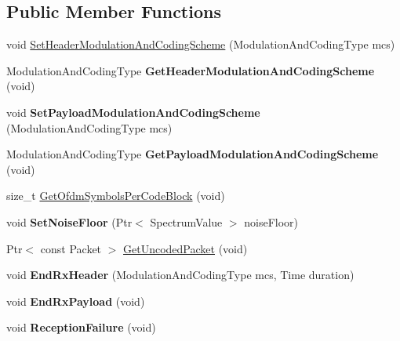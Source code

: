 \subsection*{\-Public \-Member \-Functions}
\begin{DoxyCompactItemize}
\item 
void \hyperlink{classns3_1_1PLC__InformationRatePhy_ac8d28e7f4c56c9c226a1992342ca4c06}{\-Set\-Header\-Modulation\-And\-Coding\-Scheme} (\-Modulation\-And\-Coding\-Type mcs)
\item 
\hypertarget{classns3_1_1PLC__InformationRatePhy_a5ce5620b8bffc866af027aa8cc62dd31}{\-Modulation\-And\-Coding\-Type {\bfseries \-Get\-Header\-Modulation\-And\-Coding\-Scheme} (void)}\label{classns3_1_1PLC__InformationRatePhy_a5ce5620b8bffc866af027aa8cc62dd31}

\item 
\hypertarget{classns3_1_1PLC__InformationRatePhy_a1d5d3ee73e863d3430d8c55eabd73276}{void {\bfseries \-Set\-Payload\-Modulation\-And\-Coding\-Scheme} (\-Modulation\-And\-Coding\-Type mcs)}\label{classns3_1_1PLC__InformationRatePhy_a1d5d3ee73e863d3430d8c55eabd73276}

\item 
\hypertarget{classns3_1_1PLC__InformationRatePhy_aa8b2963fd66fcb0cff550ac447337013}{\-Modulation\-And\-Coding\-Type {\bfseries \-Get\-Payload\-Modulation\-And\-Coding\-Scheme} (void)}\label{classns3_1_1PLC__InformationRatePhy_aa8b2963fd66fcb0cff550ac447337013}

\item 
size\-\_\-t \hyperlink{classns3_1_1PLC__InformationRatePhy_a84d9f169728aaf4ea913f2588002160c}{\-Get\-Ofdm\-Symbols\-Per\-Code\-Block} (void)
\item 
\hypertarget{classns3_1_1PLC__InformationRatePhy_a4dfd3765ac9010f984c0d32888f01546}{void {\bfseries \-Set\-Noise\-Floor} (\-Ptr$<$ \-Spectrum\-Value $>$ noise\-Floor)}\label{classns3_1_1PLC__InformationRatePhy_a4dfd3765ac9010f984c0d32888f01546}

\item 
\-Ptr$<$ const \-Packet $>$ \hyperlink{classns3_1_1PLC__InformationRatePhy_a4574798e3cfa52d229ffef1da89aec0d}{\-Get\-Uncoded\-Packet} (void)
\item 
\hypertarget{classns3_1_1PLC__InformationRatePhy_aa6d95a5a90c712be22bcbfd29a149d5d}{void {\bfseries \-End\-Rx\-Header} (\-Modulation\-And\-Coding\-Type mcs, \-Time duration)}\label{classns3_1_1PLC__InformationRatePhy_aa6d95a5a90c712be22bcbfd29a149d5d}

\item 
\hypertarget{classns3_1_1PLC__InformationRatePhy_a483018d01f8b198ad014488e91d32dad}{void {\bfseries \-End\-Rx\-Payload} (void)}\label{classns3_1_1PLC__InformationRatePhy_a483018d01f8b198ad014488e91d32dad}

\item 
\hypertarget{classns3_1_1PLC__InformationRatePhy_a357bfdcd62ecda47ea1bdf191fe63491}{void {\bfseries \-Reception\-Failure} (void)}\label{classns3_1_1PLC__InformationRatePhy_a357bfdcd62ecda47ea1bdf191fe63491}

\end{DoxyCompactItemize}
